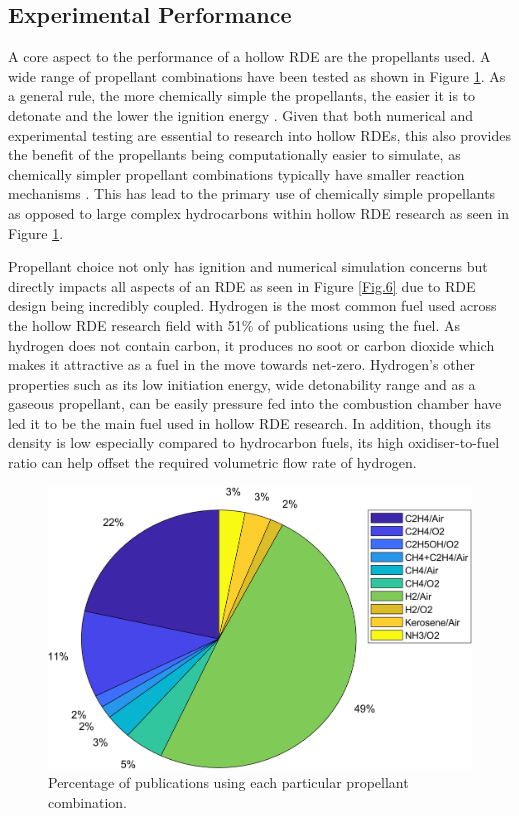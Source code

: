 \documentclass{article}
\begin{document}
\subsection{Experimental Performance}

A core aspect to the performance of a hollow RDE are the propellants used. A wide range of propellant combinations have been tested as shown in Figure \ref{Fig.5}. As a general rule, the more chemically simple the propellants, the easier it is to detonate and the lower the ignition energy \cite{Shepherd2002}. Given that both numerical and experimental testing are essential to research into hollow RDEs, this also provides the benefit of the propellants being computationally easier to simulate, as chemically simpler propellant combinations typically have smaller reaction mechanisms \cite{CERFACS}. This has lead to the primary use of chemically simple propellants as opposed to large complex hydrocarbons within hollow RDE research as seen in Figure \ref{Fig.5}.
\par

Propellant choice not only has ignition and numerical simulation concerns but directly impacts all aspects of an RDE as seen in Figure \ref{Fig.6} due to RDE design being incredibly coupled. Hydrogen is the most common fuel used across the hollow RDE research field with 51\% of publications using the fuel. As hydrogen does not contain carbon, it produces no soot or carbon dioxide which makes it attractive as a fuel in the move towards net-zero. Hydrogen’s other properties such as its low initiation energy, wide detonability range and as a gaseous propellant, can be easily pressure fed into the combustion chamber have led it to be the main fuel used in hollow RDE research. In addition, though its density is low especially compared to hydrocarbon fuels, its high oxidiser-to-fuel ratio can help offset the required volumetric flow rate of hydrogen.
\par

\begin{figure}
\centering
\includegraphics[scale=0.75]{HRDEfuelspie.png}
\caption{Percentage of publications using each particular propellant combination.}\label{Fig.5}
\end{figure}
\end{document}
